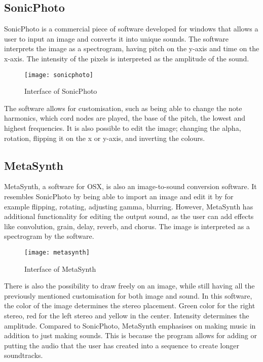 \subsection{SonicPhoto}\label{sub:sonic}
SonicPhoto \cite{White2013} is a commercial piece of software developed for windows that allows a user to input an image and converts it into unique sounds. The software interprets the image as a spectrogram, having pitch on the y-axis and time on the x-axis. The intensity of the pixels is interpreted as the amplitude of the sound. 

\begin{figure}[!h] 
\centering
\texttt{[image: sonicphoto]}
\caption{\label{fig:sonicphoto} Interface of SonicPhoto \cite{White2013}}
\end{figure}

The software allows for customisation, such as being able to change the note harmonics, which cord nodes are played, the base of the pitch, the lowest and highest frequencies. It is also possible to edit the image; changing the alpha, rotation, flipping it on the x or y-axis, and inverting the colours. 


\subsection{MetaSynth}\label{sub:metasynth}
MetaSynth, a software for OSX, is also an image-to-sound conversion software. It resembles SonicPhoto by being able to import an image and edit it by for example flipping, rotating, adjusting gamma, blurring. However, MetaSynth has additional functionality for editing the output sound, as the user can add effects like  convolution, grain, delay, reverb, and chorus. The image is interpreted as a spectrogram by the software.

\begin{figure}[!h] 
\centering
\texttt{[image: metasynth]}
\caption{\label{fig:metasynth} Interface of MetaSynth \cite{UISoftware2014}}
\end{figure}

There is also the possibility to draw freely on an image, while still having all the previously mentioned customisation for both image and sound. In this software, the color of the image determines the stereo placement. Green color for the right stereo, red for the left stereo and yellow in the center. Intensity determines the amplitude. 
Compared to SonicPhoto, MetaSynth emphasises on making music in addition to just making sounds. This is because the program allows for adding or putting the audio that the user has created into a sequence to create longer soundtracks.